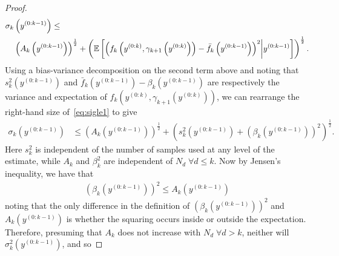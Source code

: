 \begin{proof}
\begin{align}
	\begin{split}
\sigma_k & \left(y^{(0:k-1)} \right) \le 
 \\
&\left(A_k \left(y^{(0:k-1)}\right)\right)^{\frac{1}{2}}+
\left(\mathbb{E} \left[\left(
f_k\left(y^{(0:k)}, \gamma_{k+1}\left(y^{(0:k)}\right)\right)
-\bar{f}_k\left(y^{(0:k-1)}\right)\right)^2 \middle| y^{(0:k-1)} \right] \right)^{\frac{1}{2}}.\label{eq:sigle1}
\end{split}
\end{align}
Using a bias-variance decomposition on the second term above and noting that 
$s_k^2 \left(y^{(0:k-1)} \right)$ and $\bar{f}_k\left(y^{(0:k-1)}\right)-\beta_k \left(y^{(0:k-1)} \right)$
are respectively the variance and expectation of $f_k\left(y^{(0:k)}, \gamma_{k+1}\left(y^{(0:k)}\right)\right)$,
we can rearrange the right-hand size of~\eqref{eq:sigle1} to give
\begin{align}
\sigma_k \left(y^{(0:k-1)} \right) &\le\left(A_k \left(y^{(0:k-1)}\right)\right)^{\frac{1}{2}}
+\left(s_k^2 \left(y^{(0:k-1)} \right) +
\left(\beta_k \left(y^{(0:k-1)} \right)\right)^2 
 \right)^{\frac{1}{2}}. \label{eq:sigma_bound}
\end{align}
Here $s_k^2$ is independent of the number of samples used at any level of the estimate,
while $A_k$ and $\beta_k^2$ are independent of $N_d \; \forall d\le k$.
Now by Jensen's inequality, we have that
\begin{align}
\label{eq:AleB}
\left(\beta_k \left(y^{(0:k-1)}\right)\right)^2 \le
A_k \left(y^{(0:k-1)}\right)
\end{align}
noting that the only difference in the definition of $\left(\beta_k \left(y^{(0:k-1)}\right)\right)^2$
and $A_k \left(y^{(0:k-1)}\right)$ is
whether the squaring occurs inside or outside the expectation.
Therefore, presuming that $A_k$
does not increase with $N_d  \; \forall d>k$, neither will $\sigma_k^2 \left(y^{(0:k-1)} \right)$, and so

\end{proof}
